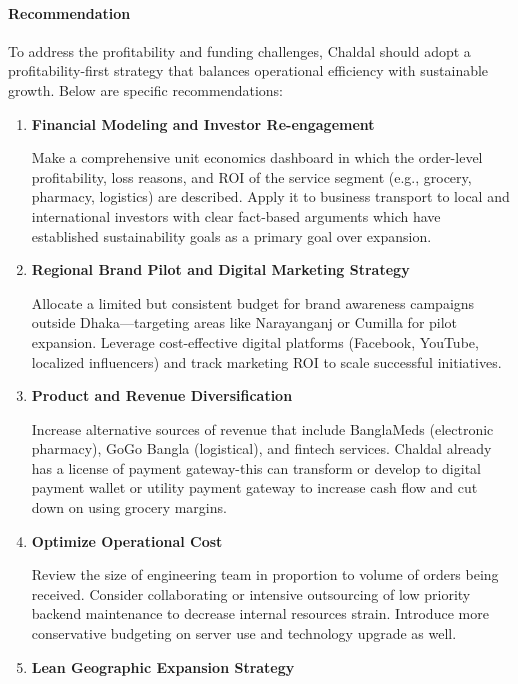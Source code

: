 \documentclass[12pt,a4paper]{article}
\begin{document}
\paragraph{Recommendation}

To address the profitability and funding challenges, Chaldal should adopt a profitability-first strategy that balances operational efficiency with sustainable growth. Below are specific recommendations:

\begin{enumerate}
    \item \textbf{Financial Modeling and Investor Re-engagement}
    
    Make a comprehensive unit economics dashboard in which the order-level profitability, loss reasons, and ROI of the service segment (e.g., grocery, pharmacy, logistics) are described. Apply it to business transport to local and international investors with clear fact-based arguments which have established sustainability goals as a primary goal over expansion.
    
    \item \textbf{Regional Brand Pilot and Digital Marketing Strategy}
    
    Allocate a limited but consistent budget for brand awareness campaigns outside Dhaka—targeting areas like Narayanganj or Cumilla for pilot expansion. Leverage cost-effective digital platforms (Facebook, YouTube, localized influencers) and track marketing ROI to scale successful initiatives.
    
    \item \textbf{Product and Revenue Diversification}
    
    Increase alternative sources of revenue that include BanglaMeds (electronic pharmacy), GoGo Bangla (logistical), and fintech services. Chaldal already has a license of payment gateway-this can transform or develop to digital payment wallet or utility payment gateway to increase cash flow and cut down on using grocery margins.
    
    \item \textbf{Optimize Operational Cost}
    
        Review the size of engineering team in proportion to volume of orders being received. Consider collaborating or intensive outsourcing of low priority backend maintenance to decrease internal resources strain. Introduce more conservative budgeting on server use and technology upgrade as well.
    
    \item \textbf{Lean Geographic Expansion Strategy}
    

\end{enumerate}
\end{document}
